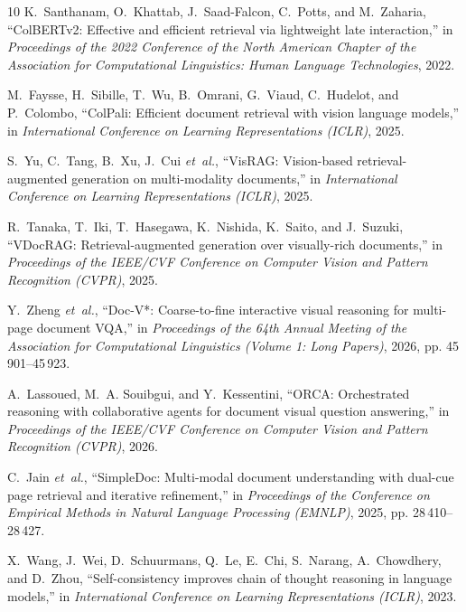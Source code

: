\documentclass[conference]{IEEEtran}
\begin{document}
\begin{thebibliography}{10}
K.~Santhanam, O.~Khattab, J.~Saad-Falcon, C.~Potts, and M.~Zaharia,
  ``{ColBERTv2}: Effective and efficient retrieval via lightweight late
  interaction,'' in \emph{Proceedings of the 2022 Conference of the North
  American Chapter of the Association for Computational Linguistics: Human
  Language Technologies}, 2022.

M.~Faysse, H.~Sibille, T.~Wu, B.~Omrani, G.~Viaud, C.~Hudelot, and P.~Colombo,
  ``{ColPali}: Efficient document retrieval with vision language models,'' in
  \emph{International Conference on Learning Representations (ICLR)}, 2025.

S.~Yu, C.~Tang, B.~Xu, J.~Cui \emph{et~al.}, ``{VisRAG}: Vision-based
  retrieval-augmented generation on multi-modality documents,'' in
  \emph{International Conference on Learning Representations (ICLR)}, 2025.

R.~Tanaka, T.~Iki, T.~Hasegawa, K.~Nishida, K.~Saito, and J.~Suzuki,
  ``{VDocRAG}: Retrieval-augmented generation over visually-rich documents,''
  in \emph{Proceedings of the IEEE/CVF Conference on Computer Vision and
  Pattern Recognition (CVPR)}, 2025.

Y.~Zheng \emph{et~al.}, ``{Doc-V*}: Coarse-to-fine interactive visual reasoning
  for multi-page document {VQA},'' in \emph{Proceedings of the 64th Annual
  Meeting of the Association for Computational Linguistics (Volume 1: Long
  Papers)}, 2026, pp. 45\,901--45\,923.

A.~Lassoued, M.~A. Souibgui, and Y.~Kessentini, ``{ORCA}: Orchestrated
  reasoning with collaborative agents for document visual question answering,''
  in \emph{Proceedings of the IEEE/CVF Conference on Computer Vision and
  Pattern Recognition (CVPR)}, 2026.

C.~Jain \emph{et~al.}, ``{SimpleDoc}: Multi-modal document understanding with
  dual-cue page retrieval and iterative refinement,'' in \emph{Proceedings of
  the Conference on Empirical Methods in Natural Language Processing (EMNLP)},
  2025, pp. 28\,410--28\,427.

X.~Wang, J.~Wei, D.~Schuurmans, Q.~Le, E.~Chi, S.~Narang, A.~Chowdhery, and
  D.~Zhou, ``Self-consistency improves chain of thought reasoning in language
  models,'' in \emph{International Conference on Learning Representations
  (ICLR)}, 2023.


\end{thebibliography}
\end{document}
